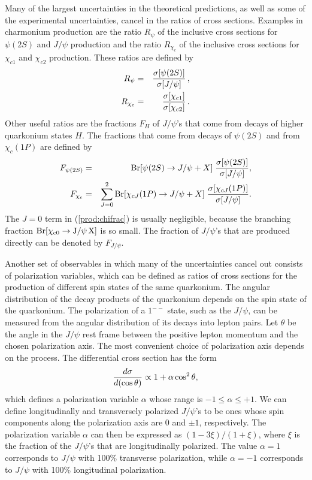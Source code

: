 Many of the largest uncertainties in the theoretical predictions, as
well as some of the experimental uncertainties, cancel in the ratios of
cross sections. Examples in charmonium production are the ratio $R_\psi$
of the inclusive cross sections for $\psi(2S)$ and $J/\psi$
production and the ratio $R_{\chi_c}$ of the inclusive cross
sections for $\chi_{c1}$ and $\chi_{c2}$ production.  These ratios
are defined by
%
\begin{eqnarray}
R_\psi &=& {\sigma[\psi(2S)] \over \sigma[J/\psi]} \, ,
\label{prod:psirat}
\\
R_{\chi_c} &=& {\sigma[\chi_{c1}] \over \sigma[\chi_{c2}]} \, .
\label{prod:chirat}
\end{eqnarray}
%
Other useful ratios are the fractions $F_H$ of $J/\psi$'s that come from 
decays of higher quarkonium states $H$.
The fractions that come from decays of $\psi(2S)$ and from $\chi_c(1P)$ 
are defined by
%
\begin{eqnarray}
F_{\psi(2S)} &=& 
{\rm Br}[\psi(2S) \to J/\psi + X] \; {\sigma[\psi(2S)] \over \sigma[J/\psi]},
\label{FJpsipsi2S}
\\
F_{\chi_c} &=& \sum_{J=0}^2
{\rm Br}[\chi_{cJ}(1P) \to J/\psi + X] \;
        {\sigma[\chi_{cJ}(1P)] \over \sigma[J/\psi]}.
\label{prod:chifrac}
\end{eqnarray}
%
The $J=0$ term in (\ref{prod:chifrac}) is usually negligible, because the 
branching fraction $\rm{Br}[\chi_{c0}\to J/\psi\,X]$ is so small.
The fraction of $J/\psi$'s that are produced directly
can be denoted by $F_{J/\psi}$.


Another set of observables in which many of the uncertainties cancel out
consists of polarization variables, which can be defined as ratios
of cross sections for the production of different spin states of the same 
quarkonium. The angular distribution of
the decay products of the quarkonium depends on the spin state of the 
quarkonium. The polarization of a $1^{--}$
state, such as the $J/\psi$, can be measured from the
angular distribution of its decays into lepton pairs. Let $\theta$ be
the angle in the $J/\psi$ rest frame between the positive lepton
momentum and the chosen polarization axis.
The most convenient choice of polarization axis depends on the process.
The differential cross section has the form
%
\begin{equation}
{ d\sigma \over d(\cos \theta)} \propto 1+\alpha\cos^2\theta,
\label{prod:alphadef}
\end{equation}
%
which defines a polarization variable $\alpha$
whose range is $-1 \le \alpha \le +1$. We can define longitudinally 
and transversely polarized $J/\psi$'s to be ones whose spin components 
along the polarization axis are 0 and $\pm 1$, respectively. 
The polarization variable $\alpha$ can 
then be expressed as $(1-3\xi)/(1+\xi)$, where $\xi$ is the 
fraction of the $J/\psi$'s that are longitudinally polarized.
The value $\alpha=1$ corresponds to $J/\psi$ with 100\% transverse
polarization, while $\alpha=-1$ corresponds to $J/\psi$ with 100\%
longitudinal polarization. 


